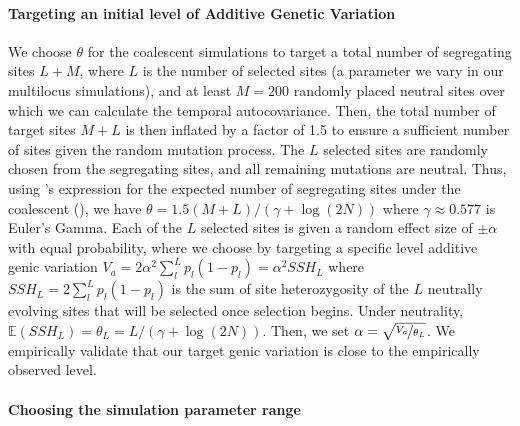 \documentclass[11pt]{article}
\newcommand{\E}{\mathbb{E}}
\begin{document}
\paragraph{Targeting an initial level of Additive Genetic Variation}
\label{sec:supp-ml-sim-va}

We choose $\theta$ for the coalescent simulations to target a total number of
segregating sites $L + M$, where $L$ is the number of selected sites (a
parameter we vary in our multilocus simulations), and at least $M=200$ randomly
placed neutral sites over which we can calculate the temporal autocovariance.
Then, the total number of target sites $M+L$ is then inflated by a factor of
1.5 to ensure a sufficient number of sites given the random mutation process.
The $L$ selected sites are randomly chosen from the segregating sites, and all
remaining mutations are neutral. Thus, using \citeauthor{Watterson1975-kt}'s
expression for the expected number of segregating sites under the coalescent
(\citeyear{Watterson1975-kt}), we have $\theta = 1.5(M+L) / (\gamma +
\log(2N))$ where $\gamma \approx 0.577$ is Euler's Gamma. Each of the $L$
selected sites is given a random effect size of $\pm \alpha$ with equal
probability, where we choose by targeting a specific level additive genic
variation $V_a = 2 \alpha^2 \sum_l^L p_l(1-p_l) = \alpha^2 SSH_L$ where $SSH_L
= 2 \sum_l^L p_l(1-p_l)$ is the sum of site heterozygosity of the $L$ neutrally
evolving sites that will be selected once selection begins. Under neutrality,
$\E(SSH_L) = \theta_L = L/(\gamma + \log(2N))$. Then, we set $\alpha =
\sqrt{\nicefrac{V_a}{\theta_L}}$. We empirically validate that our target genic
variation is close to the empirically observed level.

\paragraph{Choosing the simulation parameter range}
\label{sec:supp-ml-sim-param}
\end{document}
